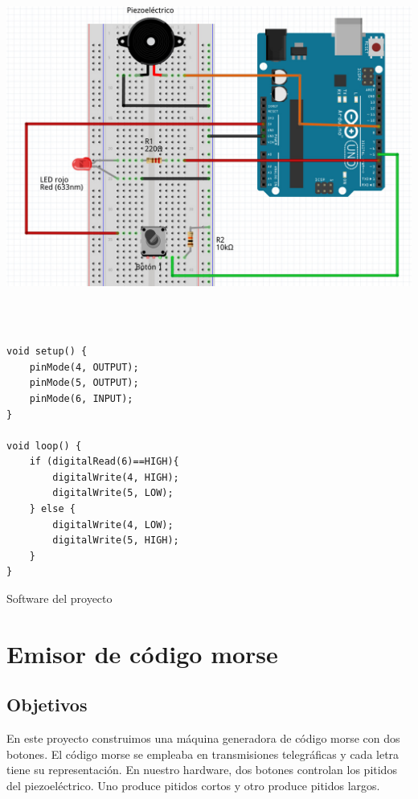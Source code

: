 \documentclass[11pt,spanish,a4paper]{article}
\begin{document}
\begin{center}
\includegraphics[height=12cm]{img/04.jpg}
\end{center}

\begin{listing}[H]
\begin{verbatim}
void setup() {
    pinMode(4, OUTPUT);
    pinMode(5, OUTPUT);
    pinMode(6, INPUT);
}

void loop() {
    if (digitalRead(6)==HIGH){
        digitalWrite(4, HIGH);
        digitalWrite(5, LOW);
    } else {
        digitalWrite(4, LOW);
        digitalWrite(5, HIGH);
    }
}
\end{verbatim}
\caption{Software del proyecto \thesection}
\end{listing}


\newpage
\section{Emisor de código morse}

\subsection{Objetivos} En este proyecto construimos una máquina generadora de código morse con dos
botones. El código morse se empleaba en transmisiones telegráficas y cada letra tiene su
representación. En nuestro hardware, dos botones controlan los pitidos del piezoeléctrico. Uno produce pitidos
cortos y otro produce pitidos largos.
\end{document}
